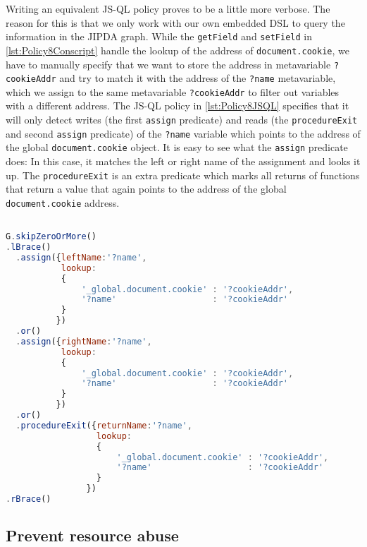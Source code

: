 Writing an equivalent JS-QL policy proves to be a little more verbose. The reason for this is that we only work with our own embedded DSL to query the information in the JIPDA graph. While the \texttt{getField} and \texttt{setField} in \ref{lst:Policy8Conscript} handle the lookup of the address of \texttt{document.cookie}, we have to manually specify that we want to store the address in metavariable \texttt{?cookieAddr} and try to match it with the address of the \texttt{?name} metavariable, which we assign to the same metavariable \texttt{?cookieAddr} to filter out variables with a different address. The JS-QL policy in \ref{lst:Policy8JSQL} specifies that it will only detect writes (the first \texttt{assign} predicate) and reads (the \texttt{procedureExit} and second \texttt{assign} predicate) of the \texttt{?name} variable which points to the address of the global \texttt{document.cookie} object. It is easy to see what the \texttt{assign} predicate does: In this case, it matches the left or right name of the assignment and looks it up. The \texttt{procedureExit} is an extra predicate which marks all returns of functions that return a value that again points to the address of the global \texttt{document.cookie} address.


\begin{lstlisting}[label={lst:Policy8JSQL},language=JavaScript,caption=Policy 8 in JS-QL,mathescape=true]  % float=t?

G.skipZeroOrMore()
.lBrace()
  .assign({leftName:'?name',
           lookup:
           {
               '_global.document.cookie' : '?cookieAddr',
               '?name'                   : '?cookieAddr' 
           }
          })
  .or()
  .assign({rightName:'?name',
           lookup:
           {
               '_global.document.cookie' : '?cookieAddr',
               '?name'                   : '?cookieAddr' 
           }
          })
  .or()
  .procedureExit({returnName:'?name',
                  lookup:
                  {
                      '_global.document.cookie' : '?cookieAddr',
                      '?name'                   : '?cookieAddr'  
                  }
                })
.rBrace()
\end{lstlisting}



\subsection{Prevent resource abuse}

